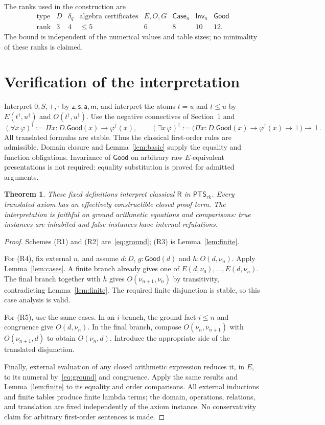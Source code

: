 \documentclass[11pt,a4paper]{article}
\newcommand{\PTS}{\mathsf{PTS}_{rk}}
\newcommand{\RR}{\mathsf R}
\newcommand{\Good}{\mathsf{Good}}
\newcommand{\Case}{\mathsf{Case}}
\newcommand{\Inv}{\mathsf{Inv}}
\newcommand{\zz}{\mathsf z}
\newcommand{\ssu}{\mathsf s}
\newcommand{\addD}{\mathsf a}
\newcommand{\mm}{\mathsf m}
\newcommand{\num}[1]{\nu_{#1}}
\newtheorem{theorem}{Theorem}
\theoremstyle{remark}\newtheorem*{remark}{Remark}
\begin{document}
The ranks used in the construction are
\[
\begin{array}{c|ccccccc}
\text{type}&D&\delta_q&\text{algebra certificates}&E,O,G&\Case_n&\Inv_n&\Good\\
\hline
\text{rank}&3&4&\leq5&6&8&10&12.
\end{array}
\]
The bound is independent of the numerical values and table sizes; no
minimality of these ranks is claimed.

\section{Verification of the interpretation}
Interpret $0,S,+,\cdot$ by $\zz,\ssu,\addD,\mm$, and interpret the atoms
$t=u$ and $t\leq u$ by $E(t^\dagger,u^\dagger)$ and
$O(t^\dagger,u^\dagger)$. Use the negative connectives of Section~1 and
\[
 (\forall x\,\varphi)^\dagger
 :=\Pi x:D.\Good(x)\to\varphi^\dagger(x),\qquad
 (\exists x\,\varphi)^\dagger
 :=\bigl(\Pi x:D.\Good(x)\to\varphi^\dagger(x)\to\bot\bigr)\to\bot.
\]
All translated formulas are stable. Thus the classical first-order rules
are admissible. Domain closure and Lemma~\ref{lem:basic} supply the equality
and function obligations. Invariance of $\Good$ on arbitrary raw
$E$-equivalent presentations is not required: equality substitution is
proved for admitted arguments.

\begin{theorem}\label{thm:main}
These fixed definitions interpret classical $\RR$ in $\PTS$. Every
translated axiom has an effectively constructible closed proof term.
The interpretation is faithful on ground arithmetic equations and comparisons:
true instances are inhabited and false instances have internal refutations.
\end{theorem}
\begin{proof}
Schemes (R1) and (R2) are~\eqref{eq:ground}; (R3) is
Lemma~\ref{lem:finite}.

For (R4), fix external $n$, and assume $d:D$, $g:\Good(d)$ and
$h:O(d,\num n)$. Apply Lemma~\ref{lem:cases}. A finite branch already gives
one of $E(d,\num0),\ldots,E(d,\num n)$. The final branch together with $h$
gives $O(\num{n+1},\num n)$ by transitivity, contradicting
Lemma~\ref{lem:finite}. The required finite disjunction is stable, so this
case analysis is valid.

For (R5), use the same cases. In an $i$-branch, the ground fact $i\leq n$
and congruence give $O(d,\num n)$. In the final branch, compose
$O(\num n,\num{n+1})$ with $O(\num{n+1},d)$ to obtain $O(\num n,d)$.
Introduce the appropriate side of the translated disjunction.

Finally, external evaluation of any closed arithmetic expression reduces
it, in $E$, to its numeral by~\eqref{eq:ground} and congruence. Apply the
same results and Lemma~\ref{lem:finite} to its equality and order comparisons.
All external inductions and finite tables produce finite lambda terms;
the domain, operations, relations, and translation are fixed independently of
the axiom instance. No conservativity claim for arbitrary first-order
sentences is made.
\end{proof}
\end{document}
